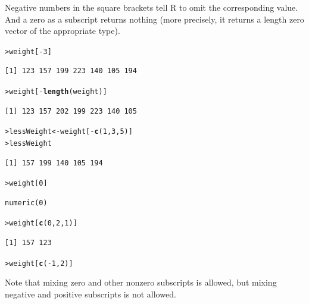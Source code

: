 \documentclass[12pt,oneside]{book}\usepackage[]{graphicx}\usepackage[]{color}
\makeatletter
\newcommand{\hlnum}[1]{\textcolor[rgb]{0.686,0.059,0.569}{#1}}%
\newcommand{\hlopt}[1]{\textcolor[rgb]{0,0,0}{#1}}%
\newcommand{\hlstd}[1]{\textcolor[rgb]{0.345,0.345,0.345}{#1}}%
\newcommand{\hlkwb}[1]{\textcolor[rgb]{0.69,0.353,0.396}{#1}}%
\newcommand{\hlkwd}[1]{\textcolor[rgb]{0.737,0.353,0.396}{\textbf{#1}}}%
\newenvironment{kframe}{%
 \def\at@end@of@kframe{}%
 \ifinner\ifhmode%
  \def\at@end@of@kframe{\end{minipage}}%
  \begin{minipage}{\columnwidth}%
 \fi\fi%
 \def\FrameCommand##1{\hskip\@totalleftmargin \hskip-\fboxsep
 \colorbox{shadecolor}{##1}\hskip-\fboxsep
     \hskip-\linewidth \hskip-\@totalleftmargin \hskip\columnwidth}%
 \MakeFramed {\advance\hsize-\width
   \@totalleftmargin\z@ \linewidth\hsize
   \@setminipage}}%
 {\par\unskip\endMakeFramed%
 \at@end@of@kframe}
\newenvironment{knitrout}{}{} %
\makeatother
\begin{document}
Negative numbers in the square brackets tell R to omit the corresponding value. And a zero as a subscript returns nothing (more precisely, it returns a length zero vector of the appropriate type). 
\begin{knitrout}
\color{fgcolor}\begin{kframe}
\begin{alltt}
\hlstd{> }\hlstd{weight[}\hlopt{-}\hlnum{3}\hlstd{]}
\end{alltt}
\begin{verbatim}
[1] 123 157 199 223 140 105 194
\end{verbatim}
\begin{alltt}
\hlstd{> }\hlstd{weight[}\hlopt{-}\hlkwd{length}\hlstd{(weight)]}
\end{alltt}
\begin{verbatim}
[1] 123 157 202 199 223 140 105
\end{verbatim}
\begin{alltt}
\hlstd{> }\hlstd{lessWeight} \hlkwb{<-} \hlstd{weight[}\hlopt{-}\hlkwd{c}\hlstd{(}\hlnum{1}\hlstd{,} \hlnum{3}\hlstd{,} \hlnum{5}\hlstd{)]}
\hlstd{> }\hlstd{lessWeight}
\end{alltt}
\begin{verbatim}
[1] 157 199 140 105 194
\end{verbatim}
\begin{alltt}
\hlstd{> }\hlstd{weight[}\hlnum{0}\hlstd{]}
\end{alltt}
\begin{verbatim}
numeric(0)
\end{verbatim}
\begin{alltt}
\hlstd{> }\hlstd{weight[}\hlkwd{c}\hlstd{(}\hlnum{0}\hlstd{,} \hlnum{2}\hlstd{,} \hlnum{1}\hlstd{)]}
\end{alltt}
\begin{verbatim}
[1] 157 123
\end{verbatim}
\begin{alltt}
\hlstd{> }\hlstd{weight[}\hlkwd{c}\hlstd{(}\hlopt{-}\hlnum{1}\hlstd{,} \hlnum{2}\hlstd{)]}
\end{alltt}


{\ttfamily\noindent\bfseries\color{errorcolor}{Error in weight[c(-1, 2)]: only 0's may be mixed with negative subscripts}}\end{kframe}
\end{knitrout}
Note that mixing zero and other nonzero subscripts is allowed, but mixing negative and positive subscripts is not allowed.
\end{document}
